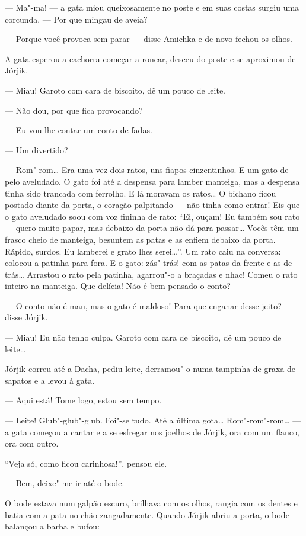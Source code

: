 --- Ma"-ma! --- a gata miou queixosamente no poste e em suas costas
surgiu uma corcunda. --- Por que mingau de aveia?

--- Porque você provoca sem parar --- disse Amichka e de novo fechou os
olhos.

A gata esperou a cachorra começar a roncar, desceu do poste e se
aproximou de Jórjik.

--- Miau! Garoto com cara de biscoito, dê um pouco de leite.

--- Não dou, por que fica provocando?

--- Eu vou lhe contar um conto de fadas.

--- Um divertido?

--- Rom"-rom\ldots{} Era uma vez dois ratos, uns fiapos cinzentinhos. E um
gato de pelo aveludado. O gato foi até a despensa para lamber manteiga,
mas a despensa tinha sido trancada com ferrolho. E lá moravam os
ratos\ldots{} O bichano ficou postado diante da porta, o coração palpitando
--- não tinha como entrar! Eis que o gato aveludado soou com voz fininha
de rato: ``Ei, ouçam! Eu também sou rato --- quero muito papar, mas
debaixo da porta não dá para passar\ldots{} Vocês têm um frasco cheio de
manteiga, besuntem as patas e as enfiem debaixo da porta. Rápido,
surdos. Eu lamberei e grato lhes serei\ldots{}''. Um rato caiu na conversa:
colocou a patinha para fora. E o gato: zás"-trás! com as patas da frente
e as de trás\ldots{} Arrastou o rato pela patinha, agarrou"-o a braçadas e
nhac! Comeu o rato inteiro na manteiga. Que delícia! Não é bem pensado o
conto?

--- O conto não é mau, mas o gato é maldoso! Para que enganar desse
jeito? --- disse Jórjik.

--- Miau! Eu não tenho culpa. Garoto com cara de biscoito, dê um pouco
de leite\ldots{}

Jórjik correu até a Dacha, pediu leite, derramou"-o numa tampinha de
graxa de sapatos e a levou à gata.

--- Aqui está! Tome logo, estou sem tempo.

--- Leite! Glub"-glub"-glub. Foi"-se tudo. Até a última gota\ldots{}
Rom"-rom"-rom\ldots{} --- a gata começou a cantar e a se esfregar nos joelhos
de Jórjik, ora com um flanco, ora com outro.

``Veja só, como ficou carinhosa!'', pensou ele.

--- Bem, deixe"-me ir até o bode.

O bode estava num galpão escuro, brilhava com os olhos, rangia com os
dentes e batia com a pata no chão zangadamente. Quando Jórjik abriu a
porta, o bode balançou a barba e bufou:

